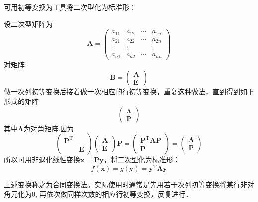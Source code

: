\begin{theorem}[合同变换法]
    可用初等变换为工具将二次型化为标准形：

    设二次型矩阵为
    $$\boldsymbol{A}=\left(\begin{array}{cccc}
        a_{11} & a_{12} & \cdots & a_{1n} \\
        a_{21} & a_{22} & \cdots & a_{2n} \\
        \vdots & \vdots &  &\vdots\\
        a_{n1} & a_{n2} & \cdots & a_{nn} 
    \end{array}\right)$$
    对矩阵$$\boldsymbol{B}=\left(\begin{array}{c}
        \boldsymbol{A}\\
        \boldsymbol{E}
    \end{array}\right)$$
    做一次列初等变换后接着做一次相应的行初等变换，重复这种做法，直到得到如下形式的矩阵
    $$\left(\begin{array}{c}
        \boldsymbol{\Lambda}\\
        \boldsymbol{P}
    \end{array}\right)$$
    其中$\boldsymbol{\Lambda}$为对角矩阵.因为
    $$\left(\begin{array}{cc}
        \boldsymbol{P}^\mathrm{T} & \\
        & \boldsymbol{E}
    \end{array}\right)
    \left(\begin{array}{c}
        \boldsymbol{A}\\
        \boldsymbol{E}
    \end{array}\right)\boldsymbol{P}=\left(\begin{array}{c}
        \boldsymbol{P}^\mathrm{T}\boldsymbol{A}\boldsymbol{P}\\
        \boldsymbol{P}
    \end{array}\right)=\left(\begin{array}{c}
        \boldsymbol{\Lambda}\\
        \boldsymbol{P}
    \end{array}\right)$$
    所以可用非退化线性变换$\boldsymbol{x}=\boldsymbol{P}\boldsymbol{y}$，将二次型化为标准形：
    $$f(\boldsymbol{x})=g(\boldsymbol{y})=\boldsymbol{y}^\mathrm{T}\boldsymbol{\Lambda}\boldsymbol{y}$$

    上述变换称之为合同变换法。实际使用时通常是先用若干次列初等变换将某行非对角元化为0,
    再依次做同样次数的相应行初等变换，反复进行．
\end{theorem}

